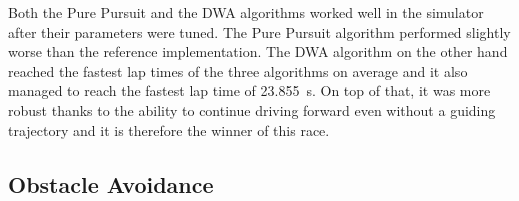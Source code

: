 Both the Pure Pursuit and the \gls*{DWA} algorithms worked well in the simulator after their parameters were tuned. The Pure Pursuit algorithm performed slightly worse than the reference implementation. The \gls*{DWA} algorithm on the other hand reached the fastest lap times of the three algorithms on average and it also managed to reach the fastest lap time of \SI{23.855}{\second}. On top of that, it was more robust thanks to the ability to continue driving forward even without a guiding trajectory and it is therefore the winner of this race.

\subsection{Obstacle Avoidance}

